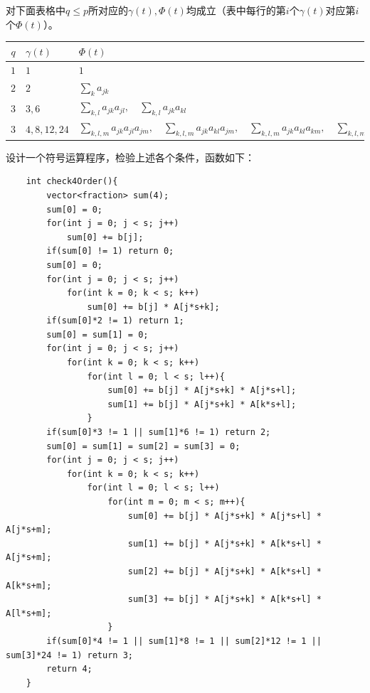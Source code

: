 \documentclass[twoside,a4paper]{article}
\begin{document}
对下面表格中$q\leq p$所对应的$\gamma(t),\Phi(t)$均成立（表中每行的第$i$个$\gamma(t)$对应第$i$个$\Phi(t)$）。

\begin{table}[H]
    \renewcommand\arraystretch{1.5}
    \centering
    \begin{tabular}{c|l|l}
        $q$ & $\gamma(t)$ & $\Phi(t)$ \\ \hline
        $1$ & $1$ & $1$ \\ \hline
        $2$ & $2$ & $\sum_k a_{jk}$ \\ \hline
        $3$ & $3,6$ & $\sum_{k,l} a_{jk}a_{jl},\quad \sum_{k,l}a_{jk}a_{kl}$ \\ \hline
        $3$ & $4,8,12,24$ & $\sum_{k,l,m} a_{jk}a_{jl}a_{jm},\quad \sum_{k,l,m}a_{jk}a_{kl}a_{jm} ,\quad \sum_{k,l,m}a_{jk}a_{kl}a_{km} ,\quad \sum_{k,l,m}a_{jk}a_{kl}a_{lm}$ \\ \hline
    \end{tabular}
\end{table}

设计一个符号运算程序，检验上述各个条件，函数如下：
\begin{lstlisting}
    int check4Order(){
        vector<fraction> sum(4);
        sum[0] = 0;
        for(int j = 0; j < s; j++)
            sum[0] += b[j];
        if(sum[0] != 1) return 0;
        sum[0] = 0;
        for(int j = 0; j < s; j++)
            for(int k = 0; k < s; k++)
                sum[0] += b[j] * A[j*s+k];
        if(sum[0]*2 != 1) return 1;
        sum[0] = sum[1] = 0;
        for(int j = 0; j < s; j++)
            for(int k = 0; k < s; k++)
                for(int l = 0; l < s; l++){
                    sum[0] += b[j] * A[j*s+k] * A[j*s+l];
                    sum[1] += b[j] * A[j*s+k] * A[k*s+l];
                }
        if(sum[0]*3 != 1 || sum[1]*6 != 1) return 2;
        sum[0] = sum[1] = sum[2] = sum[3] = 0;
        for(int j = 0; j < s; j++)
            for(int k = 0; k < s; k++)
                for(int l = 0; l < s; l++)
                    for(int m = 0; m < s; m++){
                        sum[0] += b[j] * A[j*s+k] * A[j*s+l] * A[j*s+m];
                        sum[1] += b[j] * A[j*s+k] * A[k*s+l] * A[j*s+m];
                        sum[2] += b[j] * A[j*s+k] * A[k*s+l] * A[k*s+m];
                        sum[3] += b[j] * A[j*s+k] * A[k*s+l] * A[l*s+m];
                    }
        if(sum[0]*4 != 1 || sum[1]*8 != 1 || sum[2]*12 != 1 || sum[3]*24 != 1) return 3;
        return 4;
    }
\end{lstlisting}
\end{document}
